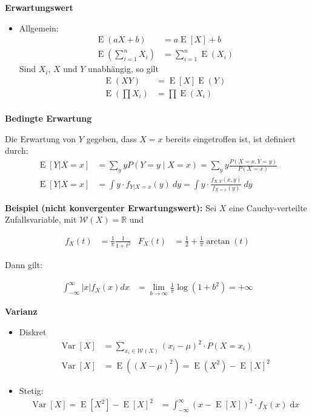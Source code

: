 \documentclass[25pt]{sciposter}
\newcommand{\R}{\mathbb{R}}
\newcommand{\W}{\mathcal{W}}
\newcommand{\Var}{\operatorname{Var}}
\newcommand{\E}{\operatorname{E}}
\newcommand{\rmd}{\mathrm{d}}
\newenvironment{method}[1]{\begin{mdframed}[backgroundcolor=blue!10,innertopmargin=15pt, innerbottommargin=15pt,nobreak=true]
		\textbf{#1 }
	}
	{ 
	\end{mdframed}
}
\begin{document}
\begin{multicols}{3}
\begin{method}{Erwartungswert}
\begin{itemize}
				\item Allgemein:
				\begin{align*}
					\E(aX+b) &= a\E[X] + b\\
					\E \left( \sum_{i=1}^n X_i \right) &= \sum_{i=1}^n \E(X_i)
				\end{align*}	
				Sind $X_i$, $X$ und $Y$ unabhängig, so gilt
				\begin{align*}
					\E(XY) &= \E[X]\E(Y)\\
					\E \left( \prod X_i \right) &= \prod \E(X_i)\\
				\end{align*}
				
			\end{itemize}
			
			
		\end{method}
		
		\begin{method}{Bedingte Erwartung}
			Die Erwartung von $Y$ gegeben, dass $X=x$ bereits eingetroffen ist, ist definiert durch:
			\begin{align*}
				\E[Y|X=x] &= \sum _{y}yP(Y=y\mid X=x)=\sum _{y}y{\frac {P(X=x,Y=y)}{P(X=x)}}\\
				\E[Y|X=x] &= \int y\cdot  f_{Y|X=x}(y)\  dy = \int y\cdot  \frac{f_{X,Y}(x,y)}{f_{X=x}(y)} \ dy
			\end{align*}
		\end{method}
		
		
		\textbf{Beispiel (nicht konvergenter Erwartungswert):}
		Sei $X$ eine Cauchy-verteilte Zufallsvariable, mit $\W(X) = \R$ und
		
		\begin{align*}
			f_X(t) &= \frac{1}{\pi} \frac{1}{1+t^2}
			& 
			F_X(t) &= \frac{1}{2} + \frac{1}{\pi}\arctan(t)
		\end{align*}
		
		Dann gilt:
		
		\begin{align*}
			\int_{-\infty}^\infty |x|f_X(x) dx &= \lim\limits_{b\to\infty} \frac{1}{\pi}\log(1+b^2) = +\infty
		\end{align*}
		
		
		
		
		\begin{method}{Varianz}
			\begin{itemize}
				\item Diskret
				\begin{align*}
					\Var[X] &= \sum_{x_i \in \mathcal{W}(X)} (x_i - \mu)^2 \cdot P(X=x_i) \\
					\Var[X] &= \E((X - \mu)^2) = \E(X^2) - \E[X]^2
				\end{align*}
				\item Stetig:
				\begin{align*}
					\Var[X] =  \E{[X^2]} - \E{[X]}^2  &= \int_{-\infty}^{\infty} (x - \E[X])^2 \cdot f_X(x) \; \rmd x
				\end{align*}
				

\end{itemize}
\end{method}
\end{multicols}
\end{document}
